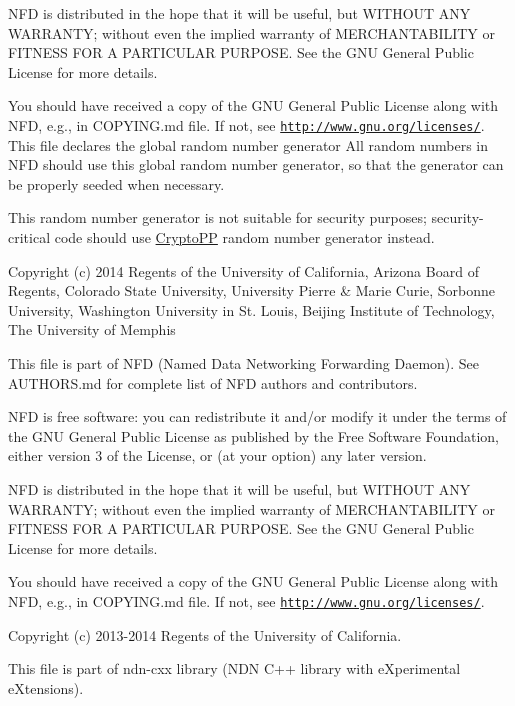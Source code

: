 N\+FD is distributed in the hope that it will be useful, but W\+I\+T\+H\+O\+UT A\+NY W\+A\+R\+R\+A\+N\+TY; without even the implied warranty of M\+E\+R\+C\+H\+A\+N\+T\+A\+B\+I\+L\+I\+TY or F\+I\+T\+N\+E\+SS F\+OR A P\+A\+R\+T\+I\+C\+U\+L\+AR P\+U\+R\+P\+O\+SE. See the G\+NU General Public License for more details.

You should have received a copy of the G\+NU General Public License along with N\+FD, e.\+g., in C\+O\+P\+Y\+I\+N\+G.\+md file. If not, see \href{http://www.gnu.org/licenses/}{\tt http\+://www.\+gnu.\+org/licenses/}. This file declares the global random number generator All random numbers in N\+FD should use this global random number generator, so that the generator can be properly seeded when necessary.

This random number generator is not suitable for security purposes; security-\/critical code should use \hyperlink{namespaceCryptoPP}{Crypto\+PP} random number generator instead.

Copyright (c) 2014 Regents of the University of California, Arizona Board of Regents, Colorado State University, University Pierre \& Marie Curie, Sorbonne University, Washington University in St. Louis, Beijing Institute of Technology, The University of Memphis

This file is part of N\+FD (Named Data Networking Forwarding Daemon). See A\+U\+T\+H\+O\+R\+S.\+md for complete list of N\+FD authors and contributors.

N\+FD is free software\+: you can redistribute it and/or modify it under the terms of the G\+NU General Public License as published by the Free Software Foundation, either version 3 of the License, or (at your option) any later version.

N\+FD is distributed in the hope that it will be useful, but W\+I\+T\+H\+O\+UT A\+NY W\+A\+R\+R\+A\+N\+TY; without even the implied warranty of M\+E\+R\+C\+H\+A\+N\+T\+A\+B\+I\+L\+I\+TY or F\+I\+T\+N\+E\+SS F\+OR A P\+A\+R\+T\+I\+C\+U\+L\+AR P\+U\+R\+P\+O\+SE. See the G\+NU General Public License for more details.

You should have received a copy of the G\+NU General Public License along with N\+FD, e.\+g., in C\+O\+P\+Y\+I\+N\+G.\+md file. If not, see \href{http://www.gnu.org/licenses/}{\tt http\+://www.\+gnu.\+org/licenses/}.

Copyright (c) 2013-\/2014 Regents of the University of California.

This file is part of ndn-\/cxx library (N\+DN C++ library with e\+Xperimental e\+Xtensions).

